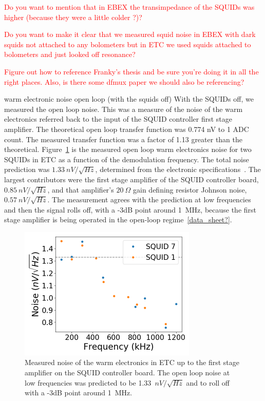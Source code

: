 \textcolor{red}{Do you want to mention that in EBEX the transimpedance of the SQUIDs was higher (because they were a little colder ?)?}

\textcolor{red}{Do you want to make it clear that we measured squid noise in EBEX with dark squids not attached to any bolometers but in ETC we used squids attached to bolometers and just looked off resonance?}

\textcolor{red}{Figure out how to reference Franky's thesis and be sure you're doing it in all the right places. Also, is there some dfmux paper we should also be referencing?}

warm electronic noise open loop (with the squids off)
With the \ac{SQUID}s off, we measured the open loop noise.
This was a measure of the noise of the warm electronics referred back to the input of the \ac{SQUID} controller first stage amplifier. 
The theoretical open loop transfer function was 0.774 nV to 1 \ac{ADC} count. 
The measured transfer function was a factor of 1.13 greater than the theoretical. 
Figure~\ref{fig:dark_electronic_noise} is the measured open loop warm electronics noise for two \ac{SQUID}s in \ac{ETC} as a function of the demodulation frequency. 
The total noise prediction was $1.33~nV/\sqrt{Hz}$, determined from the electronic specifications~\cite{aubin_thesis}. 
The largest contributors were the first stage amplifier of the \ac{SQUID} controller board, $0.85~nV/\sqrt{Hz}$, and that amplifier's $20~\Omega$ gain defining resistor Johnson noise, $0.57~nV/\sqrt{Hz}$. 
The measurement agrees with the prediction at low frequencies and then the signal rolls off, with a -3dB point around 1~MHz, because the first stage amplifier is being operated in the open-loop regime~\ref{data_sheet?}.  


\begin{figure}[ht!]
\begin{center}
\includegraphics[height=2.5in]{figures/warm_electronic_noise.png}
\caption{Measured noise of the warm electronics in \ac{ETC} up to the first stage amplifier on the \ac{SQUID} controller board. The open loop noise at low frequencies was predicted to be 1.33~$nV/\sqrt{Hz}$ and to roll off with a -3dB point around 1~MHz. 
\label{fig:dark_electronic_noise} }
\end{center}
\end{figure}


